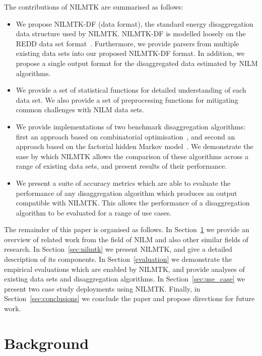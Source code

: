 \documentclass{sig-alternate}
\newcommand{\bluecolor}[1]{\textcolor{blue}{#1}}
\newcommand{\secref}[1]{Section~\ref{#1}}
\begin{document}
The contributions of NILMTK are summarised as follows:
\begin{itemize}
\item We propose NILMTK-DF (data format), the standard energy disaggregation data structure used by NILMTK.  NILMTK-DF is modelled loosely on the REDD data set format~\cite{redd}. Furthermore, we provide parsers from multiple existing data sets into our proposed NILMTK-DF format. In addition, we propose a single output format for the disaggregated data estimated by NILM algorithms.
\item We provide a set of statistical functions for detailed understanding of each data set.  We also provide a set of preprocessing functions for mitigating common challenges with NILM data sets.
\item We provide implementations of two benchmark disaggregation algorithms: first an approach based on combinatorial optimisation~\cite{hart_1992}, and second an approach based on the factorial hidden Markov model~\cite{redd,kim_2011}. We demonstrate the ease by which NILMTK allows the comparison of these algorithms across a range of existing data sets, and present results of their performance.
\item We present a suite of accuracy metrics which are able to evaluate the performance of any disaggregation algorithm which produces an output compatible with NILMTK. This allows the performance of a disaggregation algorithm to be evaluated for a range of use cases.
\end{itemize}

The remainder of this paper is organised as follows. In \secref{sec:related} we provide an overview of related work from the field of NILM and also other similar fields of research. In \secref{sec:nilmtk} we present NILMTK, and give a detailed description of its components. In \secref{evaluation} we demonstrate the empirical evaluations which are enabled by NILMTK, and provide analyses of existing data sets and disaggregation algorithms. In \secref{sec:use_case} we present two case study deployments using NILMTK. Finally, in \secref{sec:conclusions} we conclude the paper and propose directions for future work.

\section{Background}
\label{sec:related}
\end{document}
